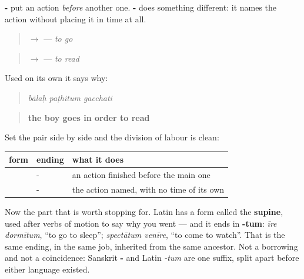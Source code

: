 \begin{grammarlens}[title={Grammar Lens: the form that names the action itself}]
\textbf{-} put an action \emph{before} another one. \textbf{-} does something different: it names the action without placing it in time at all.

\begin{quote}
\textbf{} $\to$ \textbf{} — \emph{to go}
\end{quote}

\begin{quote}
\textbf{} $\to$ \textbf{} — \emph{to read}
\end{quote}

Used on its own it says why:

\begin{quote}
\textbf{  }
\end{quote}

\begin{quote}
\emph{bālaḥ paṭhitum gacchati}
\end{quote}

\begin{quote}
\textbf{the boy goes in order to read}
\end{quote}

Set the pair side by side and the division of labour is clean:

\noindent
\begin{tabularx}{\linewidth}{@{}>{\raggedright\arraybackslash}X>{\raggedright\arraybackslash}X>{\raggedright\arraybackslash}X@{}}
\toprule
\textbf{form} & \textbf{ending} & \textbf{what it does} \\
\midrule
\textbf{\sk{गत्वा}} & -\sk{त्वा} & an action finished before the main one \\
\textbf{\sk{गन्तुम्}} & -\sk{तुम्} & the action named, with no time of its own \\
\bottomrule
\end{tabularx}

Now the part that is worth stopping for. Latin has a form called the \textbf{supine}, used after verbs of motion to say why you went — and it ends in \textbf{-tum}: \emph{īre dormītum}, \textquotedblleft{}to go to sleep\textquotedblright{}; \emph{spectātum venīre}, \textquotedblleft{}to come to watch\textquotedblright{}. That is the same ending, in the same job, inherited from the same ancestor. Not a borrowing and not a coincidence: Sanskrit \textbf{-} and Latin \emph{-tum} are one suffix, split apart before either language existed.
\end{grammarlens}

